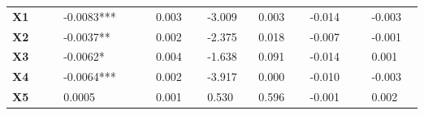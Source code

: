 \begin{center}
\begin{longtable}{p{0.1\linewidth}p{0.18\linewidth}p{0.1\linewidth}p{0.1\linewidth}p{0.1\linewidth}p{0.12\linewidth}p{0.1\linewidth}}
		\textbf{X1} & -0.0083***    & 0.003            & -3.009     & 0.003               & -0.014          & -0.003          \\
		\textbf{X2} & -0.0037**     & 0.002            & -2.375     & 0.018               & -0.007          & -0.001          \\
		\textbf{X3} & -0.0062*      & 0.004            & -1.638     & 0.091               & -0.014          & 0.001           \\
		\textbf{X4} & -0.0064***    & 0.002            & -3.917     & 0.000               & -0.010          & -0.003          \\
		\textbf{X5} & 0.0005        & 0.001            & 0.530      & 0.596               & -0.001          & 0.002           \\
		\bottomrule
	\end{longtable}
\end{center}
